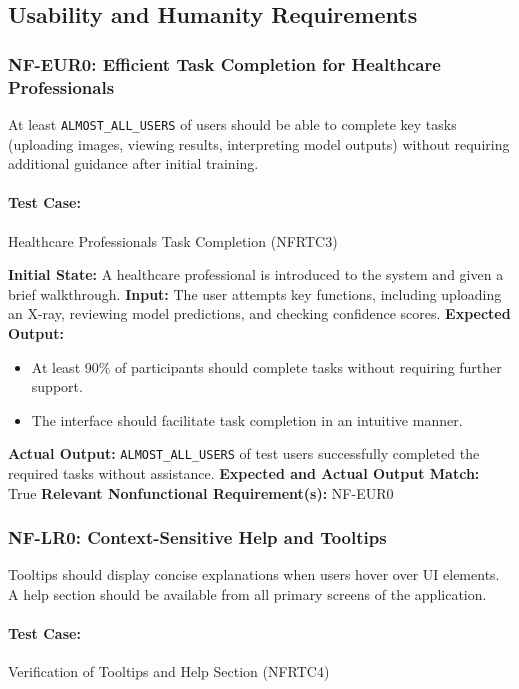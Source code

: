 \documentclass[12pt, titlepage]{article}
\begin{document}
\subsection{Usability and Humanity Requirements}

\subsubsection{NF-EUR0: Efficient Task Completion for Healthcare Professionals}
At least \verb|ALMOST_ALL_USERS| of users should be able to complete key tasks (uploading images, viewing results, interpreting model outputs) without requiring additional guidance after initial training.

\paragraph{Test Case:} Healthcare Professionals Task Completion (NFRTC3)

\textbf{Initial State:} A healthcare professional is introduced to the system and given a brief walkthrough.  
\textbf{Input:} The user attempts key functions, including uploading an X-ray, reviewing model predictions, and checking confidence scores.  
\textbf{Expected Output:}
\begin{itemize}
    \item At least 90\% of participants should complete tasks without requiring further support.
    \item The interface should facilitate task completion in an intuitive manner.
\end{itemize}
\textbf{Actual Output:} \verb|ALMOST_ALL_USERS| of test users successfully completed the required tasks without assistance.  
\textbf{Expected and Actual Output Match:} True  
\textbf{Relevant Nonfunctional Requirement(s):} NF-EUR0  

\subsubsection{NF-LR0: Context-Sensitive Help and Tooltips}
Tooltips should display concise explanations when users hover over UI elements.  
A help section should be available from all primary screens of the application.

\paragraph{Test Case:} Verification of Tooltips and Help Section (NFRTC4)
\end{document}
